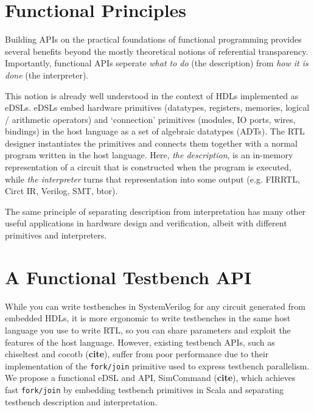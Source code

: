 \documentclass[sigplan,review,nonacm,9pt]{acmart}
\begin{document}

\maketitle

\section{Functional Principles}

Building APIs on the practical foundations of functional programming provides several benefits beyond the mostly theoretical notions of referential transparency.
Importantly, functional APIs seperate \textit{what to do} (the description) from \textit{how it is done} (the interpreter).

This notion is already well understood in the context of HDLs implemented as eDSLs.
eDSLs embed hardware primitives (datatypes, registers, memories, logical / arithmetic operators) and `connection' primitives (modules, IO ports, wires, bindings) in the host language as a set of algebraic datatypes (ADTs).
The RTL designer instantiates the primitives and connects them together with a normal program written in the host language.
Here, \textit{the description}, is an in-memory representation of a circuit that is constructed when the program is executed, while \textit{the interpreter} turns that representation into some output (e.g. FIRRTL, Circt IR, Verilog, SMT, btor).

The same principle of separating description from interpretation has many other useful applications in hardware design and verification, albeit with different primitives and interpreters.

\section{A Functional Testbench API}

While you can write testbenches in SystemVerilog for any circuit generated from embedded HDLs, it is more ergonomic to write testbenches in the same host language you use to write RTL, so you can share parameters and exploit the features of the host language.
However, existing testbench APIs, such as chiseltest and cocotb (\textbf{cite}), suffer from poor performance due to their implementation of the \texttt{fork/join} primitive used to express testbench parallelism.
We propose a functional eDSL and API, SimCommand (\textbf{cite}), which achieves fast \texttt{fork/join} by embedding testbench primitives in Scala and separating testbench description and interpretation.
\end{document}
